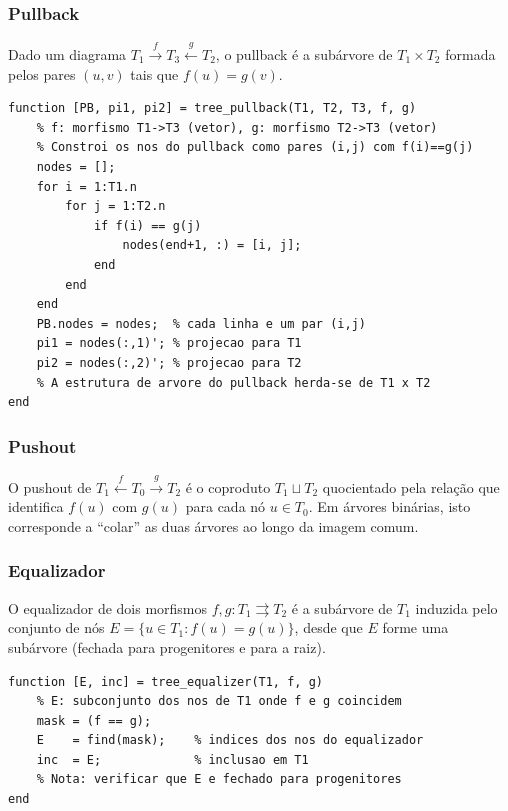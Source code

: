 \subsubsection{Pullback}

Dado um diagrama $T_1 \xrightarrow{f} T_3 \xleftarrow{g} T_2$, o pullback é a subárvore de $T_1 \times T_2$ formada pelos pares $(u,v)$ tais que $f(u) = g(v)$.

\begin{lstlisting}[style=matlab, caption={Pullback de duas árvores sobre uma terceira}]
function [PB, pi1, pi2] = tree_pullback(T1, T2, T3, f, g)
    % f: morfismo T1->T3 (vetor), g: morfismo T2->T3 (vetor)
    % Constroi os nos do pullback como pares (i,j) com f(i)==g(j)
    nodes = [];
    for i = 1:T1.n
        for j = 1:T2.n
            if f(i) == g(j)
                nodes(end+1, :) = [i, j];
            end
        end
    end
    PB.nodes = nodes;  % cada linha e um par (i,j)
    pi1 = nodes(:,1)'; % projecao para T1
    pi2 = nodes(:,2)'; % projecao para T2
    % A estrutura de arvore do pullback herda-se de T1 x T2
end
\end{lstlisting}

\subsubsection{Pushout}

O pushout de $T_1 \xleftarrow{f} T_0 \xrightarrow{g} T_2$ é o coproduto $T_1 \sqcup T_2$ quocientado pela relação que identifica $f(u)$ com $g(u)$ para cada nó $u \in T_0$. Em árvores binárias, isto corresponde a ``colar'' as duas árvores ao longo da imagem comum.

\subsubsection{Equalizador}

O equalizador de dois morfismos $f, g: T_1 \rightrightarrows T_2$ é a subárvore de $T_1$ induzida pelo conjunto de nós $E = \{u \in T_1 : f(u) = g(u)\}$, desde que $E$ forme uma subárvore (fechada para progenitores e para a raiz).

\begin{lstlisting}[style=matlab, caption={Equalizador de dois morfismos de árvores}]
function [E, inc] = tree_equalizer(T1, f, g)
    % E: subconjunto dos nos de T1 onde f e g coincidem
    mask = (f == g);
    E    = find(mask);    % indices dos nos do equalizador
    inc  = E;             % inclusao em T1
    % Nota: verificar que E e fechado para progenitores
end
\end{lstlisting}

